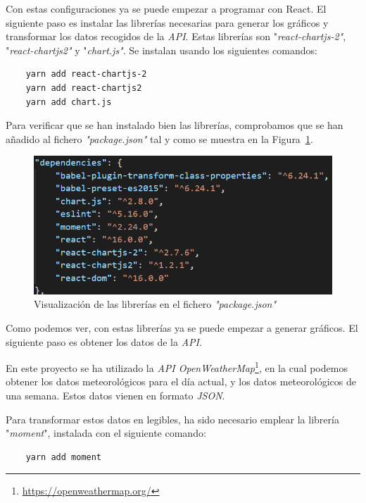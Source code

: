 \documentclass[a4paper, 12pt]{book}
\begin{document}
Con estas configuraciones ya se puede empezar a programar con React. El siguiente paso es instalar las librerías necesarias para generar los gráficos y transformar los datos recogidos de la \textit{API}. Estas librerías son "\textit{react-chartjs-2"}, "\textit{react-chartjs2"} y "\textit{chart.js"}. Se instalan usando los siguientes comandos: 
\begin{verbatim}
    yarn add react-chartjs-2
    yarn add react-chartjs2
    yarn add chart.js
\end{verbatim} 
Para verificar que se han instalado bien las librerías, comprobamos que se han añadido al fichero \textit{"package.json"} tal y como se muestra en la Figura~\ref{fig:package_chart}.
\begin{figure}[h]
  \centering
  \includegraphics{img_usadas/package_chart.png}
  \caption{Visualización de las librerías en el fichero \textit{"package.json"}}
  \label{fig:package_chart}
\end{figure}

Como podemos ver, con estas librerías ya se puede empezar a generar gráficos. El siguiente paso es obtener los datos de la \textit{API}. 

En este proyecto se ha utilizado la \textit{API OpenWeatherMap}\footnote{\url{https://openweathermap.org/}}, en la cual podemos obtener los datos meteorológicos para el día actual, y los datos meteorológicos de una semana.
Estos datos vienen en formato \textit{JSON}.

\vspace{5mm}
Para transformar estos datos en legibles, ha sido necesario emplear la librería "\textit{moment}", instalada con el siguiente comando: 
\begin{verbatim}
    yarn add moment
\end{verbatim} 
\end{document}
